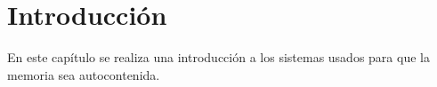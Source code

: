 \chapter*{Introducción}

En este capítulo se realiza una introducción a los sistemas usados para
que la memoria sea autocontenida.
